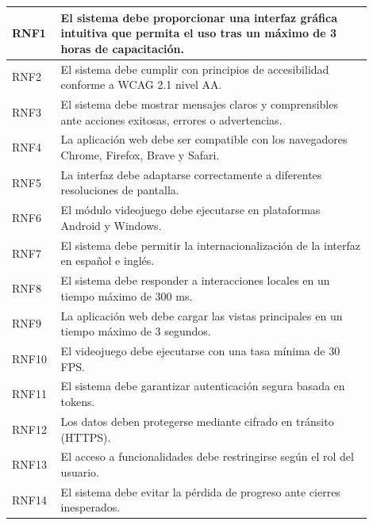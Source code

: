 \begin{longtable}{|p{0.1\linewidth}|p{0.8\linewidth}|}
	RNF1        & El sistema debe proporcionar una interfaz gráfica intuitiva que permita el uso tras un máximo de 3 horas de capacitación. \\
	\hline
	RNF2        & El sistema debe cumplir con principios de accesibilidad conforme a WCAG 2.1 nivel AA.                                     \\
	\hline
	RNF3        & El sistema debe mostrar mensajes claros y comprensibles ante acciones exitosas, errores o advertencias.                   \\
	\hline
	RNF4        & La aplicación web debe ser compatible con los navegadores Chrome, Firefox, Brave y Safari.                                \\
	\hline
	RNF5        & La interfaz debe adaptarse correctamente a diferentes resoluciones de pantalla.                                           \\
	\hline
	RNF6        & El módulo videojuego debe ejecutarse en plataformas Android y Windows.                                                    \\
	\hline
	RNF7        & El sistema debe permitir la internacionalización de la interfaz en español e inglés.                                      \\
	\hline
	RNF8        & El sistema debe responder a interacciones locales en un tiempo máximo de 300 ms.                                          \\
	\hline
	RNF9        & La aplicación web debe cargar las vistas principales en un tiempo máximo de 3 segundos.                                   \\
	\hline
	RNF10       & El videojuego debe ejecutarse con una tasa mínima de 30 FPS.                                                              \\
	\hline
	RNF11       & El sistema debe garantizar autenticación segura basada en tokens.                                                         \\
	\hline
	RNF12       & Los datos deben protegerse mediante cifrado en tránsito (HTTPS).                                                          \\
	\hline
	RNF13       & El acceso a funcionalidades debe restringirse según el rol del usuario.                                                   \\
	\hline
	RNF14       & El sistema debe evitar la pérdida de progreso ante cierres inesperados.                                                   \\

\end{longtable}
